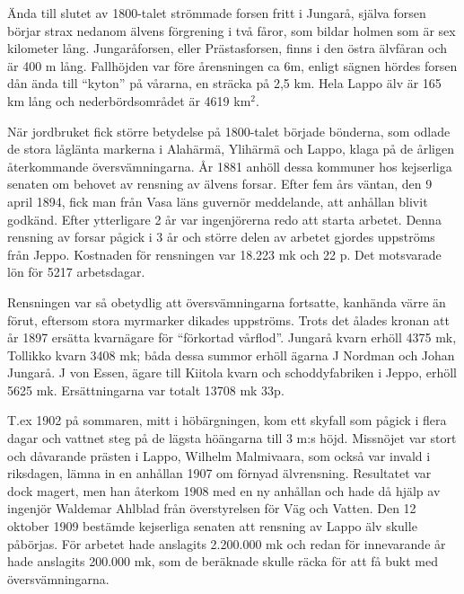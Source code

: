 %


Ända till slutet av 1800-talet strömmade forsen fritt i Jungarå, själva forsen börjar strax nedanom älvens förgrening i två fåror, som bildar holmen som är sex kilometer lång. Jungaråforsen, eller Prästasforsen, finns i den östra älvfåran och är 400 m lång. Fallhöjden var före årensningen ca 6m, enligt sägnen hördes forsen dån ända till ``kyton'' på vårarna, en  sträcka på 2,5 km. Hela Lappo älv är 165 km lång och nederbördsområdet är 4619 km$^2$.

När jordbruket fick större betydelse på 1800-talet började bönderna, som odlade de stora låglänta markerna i Alahärmä, Ylihärmä och Lappo, klaga på de årligen återkommande översvämningarna. År 1881 anhöll dessa kommuner hos kejserliga senaten om behovet av rensning av älvens forsar. Efter fem års väntan, den 9 april 1894, fick man från Vasa läns guvernör meddelande, att anhållan blivit godkänd. Efter ytterligare 2 år var ingenjörerna redo att starta arbetet. Denna rensning av forsar pågick i 3 år och större delen av arbetet gjordes uppströms från Jeppo. Kostnaden för rensningen var 18.223 mk och 22 p. Det motsvarade lön för 5217 arbetsdagar.

Rensningen var så obetydlig att översvämningarna 	fortsatte, kanhända värre än förut, eftersom stora myrmarker dikades uppströms. Trots det ålades kronan att år 1897 ersätta kvarnägare för ``förkortad vårflod''. Jungarå kvarn erhöll 4375 mk, Tollikko kvarn 3408 mk; båda dessa summor erhöll ägarna J Nordman och Johan Jungarå. J von Essen, ägare till Kiitola kvarn och schoddyfabriken i Jeppo, erhöll 5625 mk. Ersättningarna var totalt 13708 mk 33p.

T.ex 1902 på sommaren, mitt i höbärgningen, kom ett skyfall som pågick i flera dagar och vattnet steg på de lägsta höängarna till 3 m:s höjd. Missnöjet var stort och dåvarande prästen i Lappo, Wilhelm Malmivaara, som också var invald i riksdagen, lämna in en anhållan 1907 om förnyad älvrensning. Resultatet var dock magert, men han återkom 1908 med en ny anhållan och hade då hjälp av ingenjör Waldemar Ahlblad från överstyrelsen 	för Väg och Vatten. Den 12 oktober 1909 bestämde kejserliga senaten att rensning av Lappo älv skulle påbörjas. För arbetet hade anslagits 2.200.000 mk och redan för innevarande år hade anslagits 200.000 mk, som de beräknade skulle räcka för att få bukt med översvämningarna.

